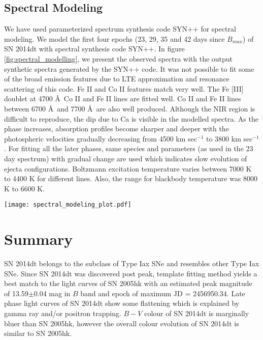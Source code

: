 \documentclass[fleqn,usenatbib]{mnras}
\begin{document}
\subsection {Spectral Modeling} 

We have used parameterized spectrum synthesis code SYN++  \citep{2007AIPC..924..342B, 2011PASP..123..237T} for spectral modeling. We model the first four epochs (23, 29, 35 and 42 days since $B$$_{max}$) of SN 2014dt with spectral synthesis code SYN++. In figure \ref{fig:spectral_modelling}, we present the observed spectra with the output synthetic spectra generated by the SYN++ code. It was not possible to fit some of the broad emission features due to LTE approximation and resonance scattering of this code. Fe II and Co II features match very well. The Fe [III] doublet at 4700 \AA~Co II and Fe II lines are fitted well. Co II and Fe II lines between 6700 \AA~and 7700 \AA~are also well produced. Although the NIR region is difficult to reproduce, the dip due to Ca is visible in the modelled spectra. As the phase increases, absorption profiles become sharper and deeper with the photospheric velocities gradually decreasing from 4500 km sec$^{-1}$ to 3800 km sec$^{-1}$. For fitting all the later phases, same species and parameters (as used in the 23 day spectrum) with gradual change are used which indicates slow evolution of ejecta configurations. Boltzmann excitation temperature varies between 7000 K to 4400 K for different lines. Also, the range for blackbody temperature was 8000 K to 6600 K.   

\begin{figure*}
	\begin{center}
		\texttt{[image: spectral\_modeling\_plot.pdf]}
	\end{center}
	\caption{A comparison between early phase observed spectra of SN 2014dt and synthetic spectra generated by SYN++ code. Prominent absorption features are marked with shaded region.}
	\label{fig:spectral_modelling}
\end{figure*} 

\section{Summary}

SN 2014dt belongs to the subclass of Type Iax SNe and resembles other Type Iax SNe. Since SN 2014dt was discovered post peak, template fitting method yields a best match to the light curves of SN 2005hk with an estimated peak magnitude of 13.59$\pm$0.04 mag in $B$ band and epoch of maximum JD = 2456950.34. Late phase light curves of SN 2014dt show some flattening which is explained by gamma ray and/or positron trapping. $B-V$ colour of SN 2014dt is marginally bluer than SN 2005hk, however the overall colour evolution of SN 2014dt is similar to SN 2005hk. 
\end{document}
